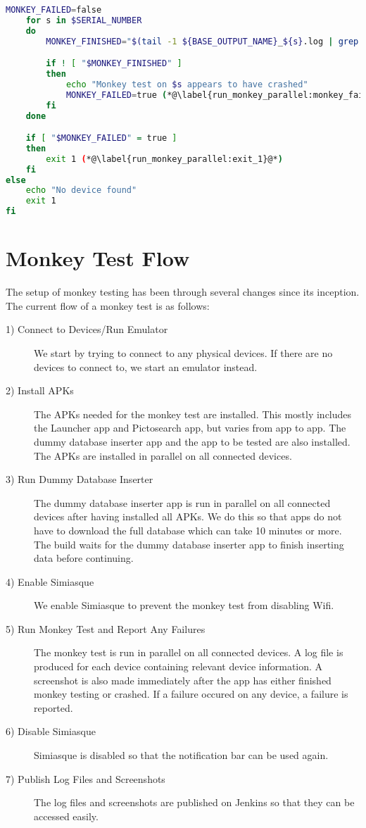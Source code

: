\begin{lstlisting}[language=bash,caption=Script that runs monkey tests on all connected devices in parallel,label=lst:run_monkey_parallel]
    MONKEY_FAILED=false
    for s in $SERIAL_NUMBER
    do
        MONKEY_FINISHED="$(tail -1 ${BASE_OUTPUT_NAME}_${s}.log | grep -i "monkey finished")" (*@\label{run_monkey_parallel:check_output}@*)

        if ! [ "$MONKEY_FINISHED" ]
        then
            echo "Monkey test on $s appears to have crashed"
            MONKEY_FAILED=true (*@\label{run_monkey_parallel:monkey_failed}@*)
        fi
    done

    if [ "$MONKEY_FAILED" = true ]
    then
        exit 1 (*@\label{run_monkey_parallel:exit_1}@*)
    fi
else
    echo "No device found"
    exit 1
fi
\end{lstlisting}

\section{Monkey Test Flow}\label{sec:monkey_test_flow}
The setup of monkey testing has been through several changes since its inception. The current flow of a monkey test is as follows:

\begin{description}
  \item[1) Connect to Devices/Run Emulator] We start by trying to connect to any physical devices. If there are no devices to connect to, we start an emulator instead.
  \item[2) Install APKs] The APKs needed for the monkey test are installed. This mostly includes the Launcher app and Pictosearch app, but varies from app to app. The dummy database inserter app and the app to be tested are also installed. The APKs are installed in parallel on all connected devices.
  \item[3) Run Dummy Database Inserter] The dummy database inserter app is run in parallel on all connected devices after having installed all APKs. We do this so that apps do not have to download the full database which can take 10 minutes or more. The build waits for the dummy database inserter app to finish inserting data before continuing.
  \item[4) Enable Simiasque] We enable Simiasque to prevent the monkey test from disabling Wifi.
  \item[5) Run Monkey Test and Report Any Failures] The monkey test is run in parallel on all connected devices. A log file is produced for each device containing relevant device information. A screenshot is also made immediately after the app has either finished monkey testing or crashed. If a failure occured on any device, a failure is reported.
  \item[6) Disable Simiasque] Simiasque is disabled so that the notification bar can be used again.
  \item[7) Publish Log Files and Screenshots] The log files and screenshots are published on Jenkins so that they can be accessed easily.
\end{description}